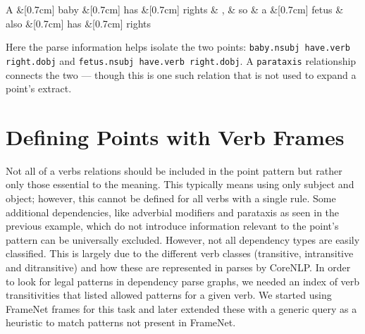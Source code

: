     \vspace{3mm}
	\begin{dependency}[edge horizontal padding=0]
		\begin{deptext}
			A \&[0.7cm] baby \&[0.7cm] has \&[0.7cm] rights \& , \& so \& a \&[0.7cm] fetus \& also \&[0.7cm] has \&[0.7cm] rights \\
		\end{deptext}


	\end{dependency}
    \vspace{-2mm}

    Here the parse information helps isolate the two points: \texttt{baby.nsubj have.verb right.dobj} and \texttt{fetus.nsubj have.verb right.dobj}. A \texttt{parataxis} relationship connects the two --- though this is one such relation that is not used to expand a point's extract.

  \section{Defining Points with Verb Frames}
    Not all of a verbs relations should be included in the point pattern but rather only those essential to the meaning. This typically means using only subject and object; however, this cannot be defined for all verbs with a single rule. Some additional dependencies, like adverbial modifiers and parataxis as seen in the previous example, which do not introduce information relevant to the point's pattern can be universally excluded. However, not all dependency types are easily classified. This is largely due to the different verb classes (transitive, intransitive and ditransitive) and how these are represented in parses by CoreNLP. In order to look for legal patterns in dependency parse graphs, we needed an index of verb transitivities that listed allowed patterns for a given verb. We started using FrameNet frames for this task and later extended these with a generic query as a heuristic to match patterns not present in FrameNet.

